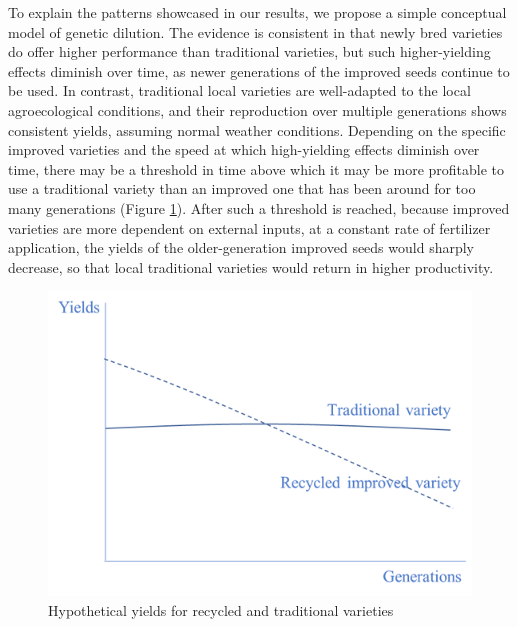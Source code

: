 \documentclass[11pt]{article}
\begin{document}
To explain the patterns showcased in our results, we propose a simple conceptual model of genetic dilution. The evidence is consistent in that newly bred varieties do offer higher performance than traditional varieties, but such higher-yielding effects diminish over time, as newer generations of the improved seeds continue to be used. In contrast, traditional local varieties are well-adapted to the local agroecological conditions, and their reproduction over multiple generations shows consistent yields, assuming normal weather conditions. Depending on the specific improved varieties and the speed at which high-yielding effects diminish over time, there may be a threshold in time above which it may be more profitable to use a traditional variety than an improved one that has been around for too many generations (Figure \ref{fig:generations}). After such a threshold is reached, because improved varieties are more dependent on external inputs, at a constant rate of fertilizer application, the yields of the older-generation improved seeds would sharply decrease, so that local traditional varieties would return in higher productivity.

\begin{figure}
    \centering
    \includegraphics[scale=0.7]{results/figures/generations.png}
    \caption{Hypothetical yields for recycled and traditional varieties}
    \label{fig:generations}
\end{figure}
\end{document}
